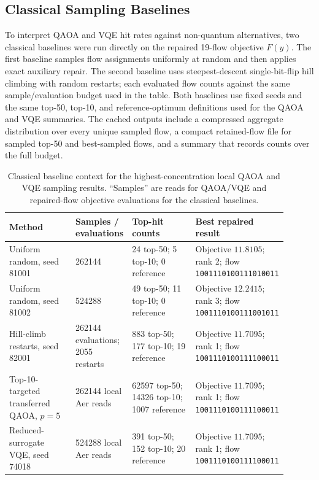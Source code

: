 \subsection{Classical Sampling Baselines}
\label{subsec:ds-mfg-classical-baselines}

To interpret QAOA and VQE hit rates against non-quantum alternatives, two
classical baselines were run directly on the repaired 19-flow objective
$F(y)$. The first baseline samples flow assignments uniformly at random and
then applies exact auxiliary repair. The second baseline uses steepest-descent
single-bit-flip hill climbing with random restarts; each evaluated flow counts
against the same sample/evaluation budget used in the table. Both baselines use
fixed seeds and the same top-50, top-10, and reference-optimum definitions used for
the QAOA and VQE summaries. The cached outputs include a compressed aggregate
distribution over every unique sampled flow, a compact retained-flow file for
sampled top-50 and best-sampled flows, and a summary that records counts over
the full budget.

\begin{table}[t]
\centering
\scriptsize
\caption{Classical baseline context for the highest-concentration local QAOA and VQE
sampling results. ``Samples'' are reads for QAOA/VQE and repaired-flow
objective evaluations for the classical baselines.}
\label{tab:ds-mfg-classical-baseline-context}
\begin{tabular}{p{0.24\linewidth}p{0.19\linewidth}p{0.23\linewidth}p{0.24\linewidth}}
\hline
Method & Samples / evaluations & Top-hit counts & Best repaired result \\
\hline
Uniform random, seed 81001 & 262144 & 24 top-50; 5 top-10; 0 reference &
Objective $11.8105$; rank 2; flow \texttt{1001110100111010011} \\
\hline
Uniform random, seed 81002 & 524288 & 49 top-50; 11 top-10; 0 reference &
Objective $12.2415$; rank 3; flow \texttt{1001110100111001011} \\
\hline
Hill-climb restarts, seed 82001 & 262144 evaluations; 2055 restarts &
883 top-50; 177 top-10; 19 reference &
Objective $11.7095$; rank 1; flow \texttt{1001110100111100011} \\
\hline
Top-10-targeted transferred QAOA, $p=5$ & 262144 local Aer reads &
62597 top-50; 14326 top-10; 1007 reference &
Objective $11.7095$; rank 1; flow \texttt{1001110100111100011} \\
\hline
Reduced-surrogate VQE, seed 74018 & 524288 local Aer reads &
391 top-50; 152 top-10; 20 reference &
Objective $11.7095$; rank 1; flow \texttt{1001110100111100011} \\
\hline
\end{tabular}
\end{table}


